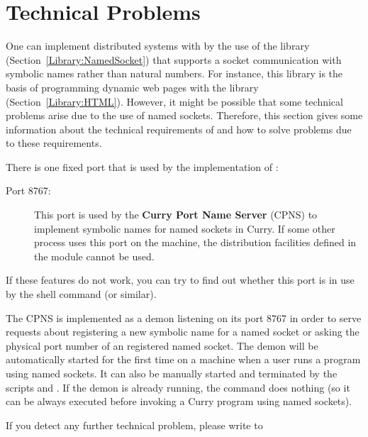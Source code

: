 \section{Technical Problems}

One can implement distributed systems with \CYS
by the use of the library  (Section~\ref{Library:NamedSocket})
that supports a socket communication with symbolic names
rather than natural numbers.
For instance, this library is the basis of programming
dynamic web pages with the library
 (Section~\ref{Library:HTML}).
However, it might be possible that some technical problems
arise due to the use of named sockets.
Therefore, this section gives some information
about the technical requirements of \CYS and how to solve
problems due to these requirements.

There is one fixed port that is used by the implementation of \CYS:
\begin{description}
\item[Port 8767:] This port is used by the
{\bf Curry Port Name Server} (CPNS) to implement symbolic names for
named sockets in Curry.
If some other process uses this port on the machine,
the distribution facilities defined in the module 
cannot be used.
\end{description}
If these features do not work, you can try to find out
whether this port is in use by the shell command
 (or similar).

The CPNS is implemented as a demon listening on its port 8767
in order to serve requests about registering a new symbolic
name for a named socket or asking the physical port number
of an registered named socket. The demon will be automatically started for
the first time on a machine when a user runs a program
using named sockets.
It can also be manually started and terminated by the
scripts  and
.
If the demon is already running,
the command 
does nothing (so it can be always executed
before invoking a Curry program using named sockets).

If you detect any further technical problem,
please write to
\begin{center}
\end{center}
